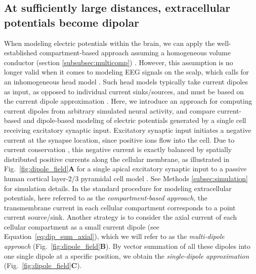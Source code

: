 \documentclass[preprint,10pt,authoryear]{elsarticle}
\newcommand{\hlb}[2][NavyBlue]{ {\sethlcolor{#1} \hl{#2}} }
\newcommand{\hlg}[2][Emerald]{ {\sethlcolor{#1} \hl{#2}} }
\newcommand{\hlp}[2][Purple]{ {\sethlcolor{#1} \hl{#2}} }
\newcommand{\snnote}[1]{\color{white}{\hlb{SN: #1 }}\color{black}}
\newcommand{\sntxt}[1]{{\color{NavyBlue}#1}}
\newcommand{\tvnnote}[1]{\color{white}{\hlg{TVN: #1 }}\color{black}}
\newcommand{\gen}[1]{\color{white}{\hlp{GTE: #1 }}\color{black}}
\begin{document}
\subsection{At sufficiently large distances, extracellular potentials become dipolar}\label{subsec:cb_db_comp_inf}



When modeling electric potentials within the brain, we can apply the well-established compartment-based approach assuming a homogeneous volume conductor (section \ref{subsubsec:multicomp}) \citep{EINEVOLL2013REVIEW,HOLT1999}.
However, this assumption is no longer valid when it comes to modeling EEG signals on the scalp, which calls for an inhomogeneous head model \citep{Ilmoniemi2019}. Such head models typically take current dipoles as input, as opposed to individual current sinks/sources, and must be based on the current dipole approximation \citep{NUNEZ2006}. Here, we introduce an approach for computing current dipoles from arbitrary simulated neural activity, and compare current-based and dipole-based modeling of electric potentials generated by a single cell receiving excitatory synaptic input.
Excitatory synaptic input initiates a negative current at the synapse location, since positive ions flow into the cell. Due to current conservation \citep{Koch1999}, this negative current is exactly balanced by spatially distributed positive currents along the cellular membrane, as illustrated in Fig.~\ref{fig:dipole_field}\textbf{A} for a single apical excitatory synaptic input to a passive human cortical layer-2/3 pyramidal cell model \citep{EYAL2016}. See Methods \ref{subsec:simulation} for simulation details.
In the standard procedure for modeling extracellular potentials, here referred to as the {\it compartment-based approach}, the transmembrane current in each cellular compartment corresponds to a point current source/sink. Another strategy is to consider the axial current of each cellular compartment as a small current dipole (see Equation~\eqref{eq:dip_sum_axial}), which we will refer to as the {\it multi-dipole approach} (Fig.~\ref{fig:dipole_field}\textbf{B}). By vector summation of all these dipoles into one single dipole at a specific position, we obtain the {\it single-dipole approximation} (Fig.~\ref{fig:dipole_field}\textbf{C}).
\end{document}
